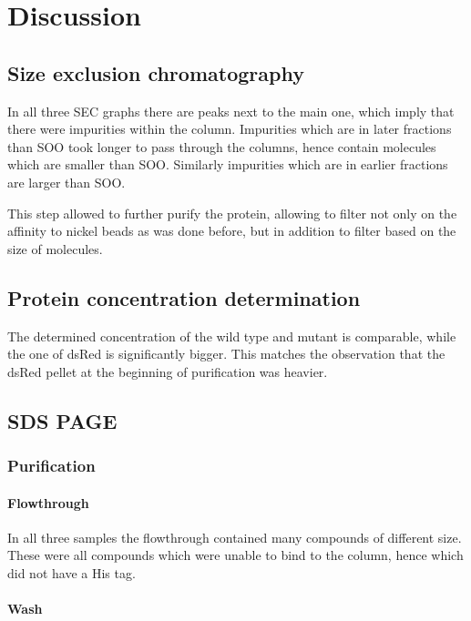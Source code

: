 \chapter{Discussion}

\section{Size exclusion chromatography}

In all three SEC graphs there are peaks next to the main one, which imply that
there were impurities within the column. Impurities which are in later
fractions than SOO took longer to pass through the columns, hence contain
molecules which are smaller than SOO. Similarly impurities which are in earlier
fractions are larger than SOO.

This step allowed to further purify the protein, allowing to filter not only on
the affinity to nickel beads as was done before, but in addition to filter
based on the size of molecules.

\section{Protein concentration determination}

The determined concentration of the wild type and mutant is comparable, while
the one of dsRed is significantly bigger. This matches the observation that the
dsRed pellet at the beginning of purification was heavier.

\section{SDS PAGE}

\subsection{Purification}

\subsubsection{Flowthrough}

In all three samples the flowthrough contained many compounds of different
size. These were all compounds which were unable to bind to the column, hence
which did not have a His tag.

\subsubsection{Wash}

